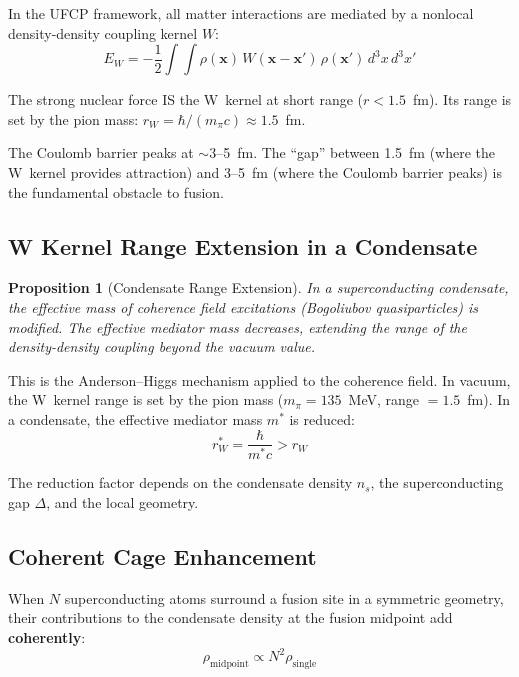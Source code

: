 \documentclass[11pt, a4paper]{article}
\newtheorem{proposition}{Proposition}[section]
\begin{document}
In the UFCP framework, all matter interactions are mediated by
a nonlocal density-density coupling kernel $W$:
\begin{equation}
  E_W = -\frac{1}{2}\int\!\int \rho(\mathbf{x})\,
  W(\mathbf{x}-\mathbf{x}')\,\rho(\mathbf{x}')\,d^3x\,d^3x'
\end{equation}

The strong nuclear force IS the W~kernel at short range
($r < 1.5$~fm). Its range is set by the pion mass:
$r_W = \hbar/(m_\pi c) \approx 1.5$~fm.

The Coulomb barrier peaks at $\sim$3--5~fm. The ``gap'' between
1.5~fm (where the W~kernel provides attraction) and 3--5~fm
(where the Coulomb barrier peaks) is the fundamental obstacle
to fusion.

\subsection{W Kernel Range Extension in a Condensate}

\begin{proposition}[Condensate Range Extension]
In a superconducting condensate, the effective mass of
coherence field excitations (Bogoliubov quasiparticles) is
modified. The effective mediator mass decreases, extending the
range of the density-density coupling beyond the vacuum value.
\end{proposition}

This is the Anderson--Higgs mechanism applied to the coherence
field. In vacuum, the W~kernel range is set by the pion mass
($m_\pi = 135$~MeV, range $= 1.5$~fm). In a condensate, the
effective mediator mass $m^*$ is reduced:
\begin{equation}
  r_W^* = \frac{\hbar}{m^* c} > r_W
\end{equation}

The reduction factor depends on the condensate density $n_s$,
the superconducting gap $\Delta$, and the local geometry.

\subsection{Coherent Cage Enhancement}

When $N$ superconducting atoms surround a fusion site in a
symmetric geometry, their contributions to the condensate
density at the fusion midpoint add \textbf{coherently}:
\begin{equation}
  \rho_{\text{midpoint}} \propto N^2 \rho_{\text{single}}
\end{equation}
\end{document}
